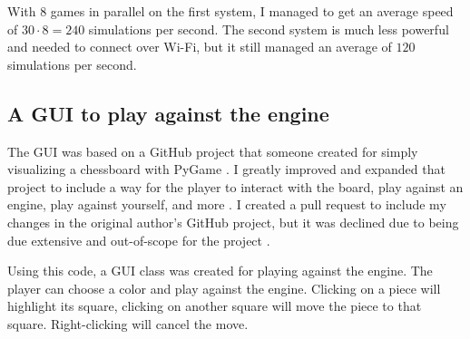 \documentclass{article}
\begin{document}
\begin{table}[H]
\caption{Comparison of multiprocessing and non-multiprocessing self-play}
\end{table}

With 8 games in parallel on the first system, I managed to get an average speed of $30 \cdot 8 = 240$ simulations per second.
The second system is much less powerful and needed to connect over Wi-Fi, but it still managed an average of $120$ simulations per second. 

\subsection{A GUI to play against the engine}

The GUI was based on a GitHub project that someone created for simply visualizing a chessboard with PyGame \cite{adefokunChessboardAhirajustice2022, pygame}.
I greatly improved and expanded that project to include a way for the player to interact with the board, play against an engine,
play against yourself, and more \cite{zjefferChessboardZjeffer2022}. I created a pull request to include my changes in the original author's GitHub project,
but it was declined due to being due extensive and out-of-scope for the project \cite{adefokunChessboard2022pull}.

Using this code, a GUI class was created for playing against the engine. The player can choose a color and play against
the engine. Clicking on a piece will highlight its square, clicking on another square will move the piece to that square.
Right-clicking will cancel the move.
\end{document}

